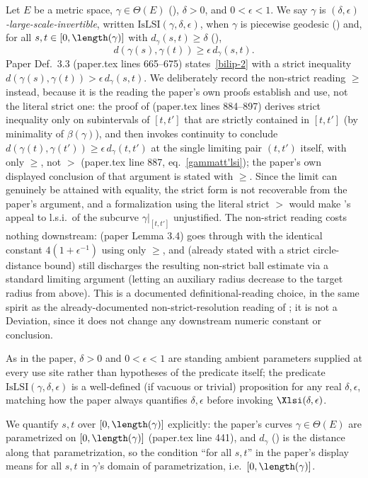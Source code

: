 \begin{definition}
  Let $E$ be a metric space, $\gamma \in \Theta(E)$ (), $\delta > 0$, and
  $0 < \epsilon < 1$. We say $\gamma$ is \emph{$(\delta,\epsilon)$-large-scale-invertible},
  written $\mathrm{IsLSI}(\gamma,\delta,\epsilon)$, when $\gamma$ is piecewise geodesic
  () and, for all $s,t \in [0,\length(\gamma)]$ with
  $d_\gamma(s,t) \geq \delta$ (),
  \[
    d(\gamma(s),\gamma(t)) \geq \epsilon\, d_\gamma(s,t)
    .
  \]
  Paper Def.~3.3 (paper.tex lines 665--675) states~\eqref{bilip-2} with a strict inequality
  $d(\gamma(s),\gamma(t)) > \epsilon\, d_\gamma(s,t)$. We deliberately record the non-strict
  reading $\geq$ instead, because it is the reading the paper's own proofs establish and use, not
  the literal strict one: the proof of  (paper.tex lines 884--897) derives
  strict inequality only on subintervals of $[t,t']$ that are strictly contained in $[t,t']$
  (by minimality of $\beta(\gamma)$), and then invokes continuity to conclude
  $d(\gamma(t),\gamma(t')) \geq \epsilon\, d_\gamma(t,t')$ at the single limiting pair $(t,t')$
  itself, with only $\geq$, not $>$ (paper.tex line 887, eq.~\eqref{gammatt'lsi}); the paper's own
  displayed conclusion of that argument is stated with $\geq$. Since the limit can genuinely be
  attained with equality, the strict form is not recoverable from the paper's argument, and a
  formalization using the literal strict $>$ would make 's appeal to l.s.i.\ of
  the subcurve $\gamma|_{[t,t']}$ unjustified. The non-strict reading costs nothing downstream:
   (paper Lemma 3.4) goes through with the identical constant
  $4(1+\epsilon^{-1})$ using only $\geq$, and  (already stated with a
  strict circle-distance bound) still discharges the resulting non-strict ball estimate via a
  standard limiting argument (letting an auxiliary radius decrease to the target radius from
  above). This is a documented definitional-reading choice, in the same spirit as the
  already-documented non-strict-resolution reading of ; it is not a
  Deviation, since it does not change any downstream numeric constant or conclusion.

  As in the paper, $\delta > 0$ and $0 < \epsilon < 1$ are standing ambient parameters supplied at
  every use site rather than hypotheses of the predicate itself; the predicate
  $\mathrm{IsLSI}(\gamma,\delta,\epsilon)$ is a well-defined (if vacuous or trivial) proposition
  for any real $\delta,\epsilon$, matching how the paper always quantifies $\delta,\epsilon$
  before invoking $\Xlsi(\delta,\epsilon)$.

  We quantify $s,t$ over $[0,\length(\gamma)]$ explicitly: the paper's curves $\gamma \in \Theta(E)$
  are parametrized on $[0,\length(\gamma)]$ (paper.tex line 441), and $d_\gamma$ ()
  is the distance along that parametrization, so the condition ``for all $s,t$'' in the paper's
  display means for all $s,t$ in $\gamma$'s domain of parametrization, i.e.\ $[0,\length(\gamma)]$.
\end{definition}
